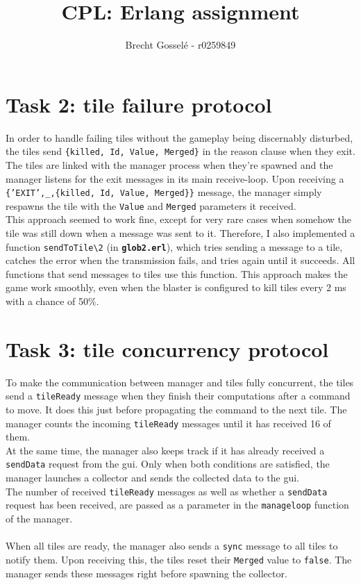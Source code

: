 \documentclass{article}
\begin{document}
\title{CPL: Erlang assignment}
\author{Brecht Gossel\'e - r0259849}
\maketitle

\section{Task 2: tile failure protocol}

In order to handle failing tiles without the gameplay being discernably disturbed, the tiles send \texttt{\{killed, Id, Value, Merged\}} in the reason clause when they exit. The tiles are linked with the manager process when they're spawned and the manager listens for the exit messages in its main receive-loop. Upon receiving a \texttt{\{'EXIT',\_,\{killed, Id, Value, Merged\}\}} message, the manager simply respawns the tile with the \texttt{Value} and \texttt{Merged} parameters it received. \\This approach seemed to work fine, except for very rare cases when somehow the tile was still down when a message was sent to it. Therefore, I also implemented a function \texttt{sendToTile\textbackslash2} (in \texttt{\textbf{glob2.erl}}), which tries sending a message to a tile, catches the error when the transmission fails, and tries again until it succeeds. All functions that send messages to tiles use this function. This approach makes the game work smoothly, even when the blaster is configured to kill tiles every 2 ms with a chance of 50\%.

\section{Task 3: tile concurrency protocol}

To make the communication between manager and tiles fully concurrent, the tiles send a \texttt{tileReady} message when they finish their computations after a command to move. It does this just before propagating the command to the next tile. The manager counts the incoming \texttt{tileReady} messages until it has received 16 of them.\\
At the same time, the manager also keeps track if it has already received a \texttt{sendData} request from the gui. Only when both conditions are satisfied, the manager launches a collector and sends the collected data to the gui.
\\The number of received \texttt{tileReady} messages as well as whether a \texttt{sendData} request has been received, are passed as a parameter in the \texttt{manageloop} function of the manager.\\\\
When all tiles are ready, the manager also sends a \texttt{sync} message to all tiles to notify them. Upon receiving this, the tiles reset their \texttt{Merged} value to \texttt{false}. The manager sends these messages right before spawning the collector.
\end{document}
